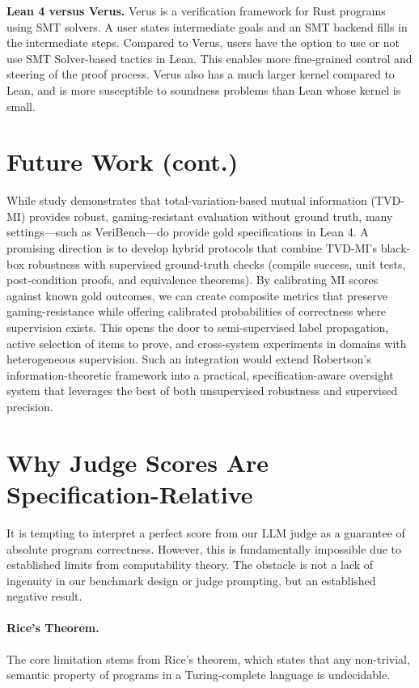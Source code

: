 \documentclass{article}
\begin{document}
\textbf{Lean 4 versus Verus.}
Verus is a verification framework for Rust programs using SMT solvers. A user states intermediate goals and an SMT backend fills in the intermediate steps. Compared to Verus, users have the option to use or not use SMT Solver-based tactics in Lean. This enables more fine-grained control and steering of the proof process. Verus also has a much larger kernel compared to Lean, and is more susceptible to soundness problems than Lean whose kernel is small.

\section{Future Work (cont.)}

While \citep{robertson2025stepbystep} study demonstrates that total-variation-based mutual information (TVD-MI) provides robust, gaming-resistant evaluation without ground truth, many settings---such as VeriBench---do provide gold specifications in Lean 4.
A promising direction is to develop hybrid protocols that combine TVD-MI's black-box robustness with supervised ground-truth checks (compile success, unit tests, post-condition proofs, and equivalence theorems).
By calibrating MI scores against known gold outcomes, we can create composite metrics that preserve gaming-resistance while offering calibrated probabilities of correctness where supervision exists.
This opens the door to semi-supervised label propagation, active selection of items to prove, and cross-system experiments in domains with heterogeneous supervision.
Such an integration would extend Robertson's information-theoretic framework into a practical, specification-aware oversight system that leverages the best of both unsupervised robustness and supervised precision.

\section{Why Judge Scores Are Specification-Relative}

It is tempting to interpret a perfect score from our LLM judge as a guarantee of absolute program correctness. However, this is fundamentally impossible due to established limits from computability theory. The obstacle is not a lack of ingenuity in our benchmark design or judge prompting, but an established negative result.

\paragraph{Rice's Theorem.}
The core limitation stems from Rice's theorem, which states that any non-trivial, semantic property of programs in a Turing-complete language is undecidable.
\end{document}
